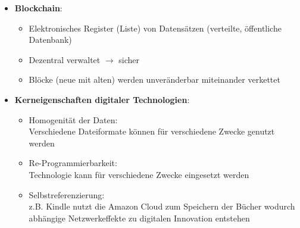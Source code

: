 \documentclass[12pt,a4paper]{article}
\begin{document}
\begin{itemize}
   \item \textbf{Blockchain}:
      \begin{itemize}
			\item Elektronisches Register (Liste) von Datensätzen (verteilte, öffentliche Datenbank)
			\item Dezentral verwaltet $\rightarrow$ sicher
			\item Blöcke (neue mit alten) werden unveränderbar miteinander verkettet
      \end{itemize}

   \item \textbf{Kerneigenschaften digitaler Technologien}:
      \begin{itemize}
			\item Homogenität der Daten:\\
			      Verschiedene Dateiformate können für verschiedene Zwecke genutzt werden
			\item Re-Programmierbarkeit:\\
			      Technologie kann für verschiedene Zwecke eingesetzt werden
			\item Selbstreferenzierung:\\
			      z.B. Kindle nutzt die Amazon Cloud zum Speichern der Bücher wodurch ab\-hän\-gi\-ge Netzwerkeffekte zu digitalen Innovation entstehen
      \end{itemize}
\end{itemize}
\end{document}
